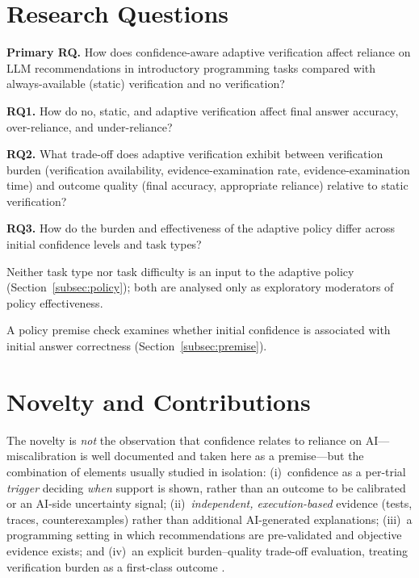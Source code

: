 \documentclass[oneside,final,14pt,a4paper]{extreport}
\begin{document}
\section{Research Questions}


\textbf{Primary RQ.} How does confidence-aware adaptive verification affect
reliance on LLM recommendations in introductory programming tasks compared
with always-available (static) verification and no verification?

\textbf{RQ1.} How do no, static, and adaptive verification affect final
answer accuracy, over-reliance, and under-reliance?

\textbf{RQ2.} What trade-off does adaptive verification exhibit between
verification burden (verification availability, evidence-examination rate,
evidence-examination time) and outcome quality (final accuracy, appropriate
reliance) relative to static verification?

\textbf{RQ3.} How do the burden and effectiveness of the adaptive policy
differ across initial confidence levels and task types?

Neither task type nor task difficulty is an input to the adaptive policy
(Section~\ref{subsec:policy}); both are analysed only as exploratory
moderators of policy effectiveness.

A policy premise check examines whether initial confidence is associated with
initial answer correctness (Section~\ref{subsec:premise}).


\section{Novelty and Contributions}


The novelty is \emph{not} the observation that confidence relates to reliance
on AI---miscalibration is well documented \cite{KrugerDunning1999,Bo2025} and
taken here as a premise---but the combination of elements usually studied in
isolation: (i)~confidence as a per-trial \emph{trigger} deciding \emph{when}
support is shown, rather than an outcome to be calibrated or an AI-side
uncertainty signal; (ii)~\emph{independent, execution-based} evidence (tests,
traces, counterexamples) rather than additional AI-generated explanations;
(iii)~a programming setting in which recommendations are pre-validated and
objective evidence exists; and (iv)~an explicit burden--quality trade-off
evaluation, treating verification burden as a first-class outcome
\cite{CascadedLM2025,Zhang2024Verify}.
\end{document}
